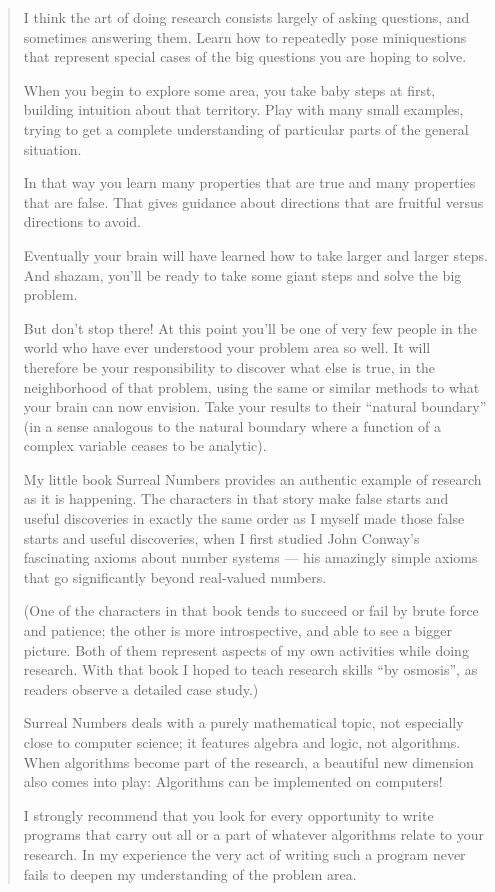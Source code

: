 \begin{framed}
\begin{quotation}
I think the art of doing research consists largely of asking questions,
and sometimes answering them. Learn how to repeatedly pose miniquestions
that represent special cases of the big questions you are hoping to solve.

When you begin to explore some area, you take baby steps at first, building
intuition about that territory. Play with many small examples, trying to
get a complete understanding of particular parts of the general situation.

In that way you learn many properties that are true and many properties
that are false. That gives guidance about directions that are fruitful
versus directions to avoid.

Eventually your brain will have learned how to take larger and larger steps.
And shazam, you’ll be ready to take some giant steps and solve the big problem.

But don’t stop there! At this point you’ll be one of very few people in the
world who have ever understood your problem area so well. It will therefore
be your responsibility to discover what else is true, in the neighborhood
of that problem, using the same or similar methods to what your brain
can now envision. Take your results to their “natural boundary” (in a sense
analogous to the natural boundary where a function of a complex variable
ceases to be analytic).

My little book Surreal Numbers provides an authentic example of research
as it is happening. The characters in that story make false starts and
useful discoveries in exactly the same order as I myself made those false starts
and useful discoveries, when I first studied John Conway’s fascinating
axioms about number systems — his amazingly simple axioms that go
significantly beyond real-valued numbers.

(One of the characters in that book tends to succeed or fail by brute force
and patience; the other is more introspective, and able to see a bigger
picture. Both of them represent aspects of my own activities while doing
research. With that book I hoped to teach research skills “by osmosis”,
as readers observe a detailed case study.)

Surreal Numbers deals with a purely mathematical topic, not especially close
to computer science; it features algebra and logic, not algorithms.
When algorithms become part of the research, a beautiful new dimension
also comes into play: Algorithms can be implemented on computers!

I strongly recommend that you look for every opportunity to write programs
that carry out all or a part of whatever algorithms relate to your research.
In my experience the very act of writing such a program never fails to
deepen my understanding of the problem area.
\end{quotation}
\end{framed}
